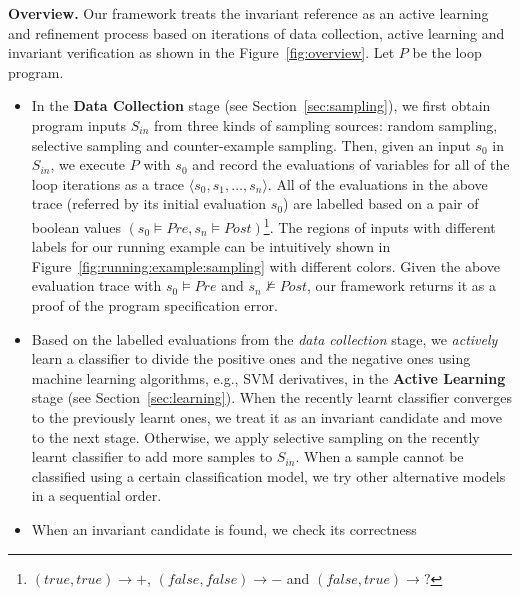 \medskip\noindent
\textbf{Overview.}
Our framework treats the invariant reference as an active learning and refinement process 
based on iterations of data collection, active learning and invariant verification 
as shown in the Figure~\ref{fig:overview}. 
Let $P$ be the loop program. 
\begin{itemize}
    \item 
    In the \textbf{Data Collection} stage (see Section~\ref{sec:sampling}), 
    we first obtain program inputs $S_{\mathit{in}}$ from three kinds of sampling sources: 
    random sampling, selective sampling and counter-example sampling. 
    Then, given an input $s_0$ in $S_{\mathit{in}}$, we execute $P$ with $s_0$ 
    and record the evaluations of variables for all of the loop iterations
    as a trace $\langle s_0, s_1, \ldots, s_n \rangle$.  
    All of the evaluations in the above trace (referred by its initial evaluation $s_0$) 
    are labelled based on a pair of boolean values 
    $(s_0 \models \mathit{Pre}, s_n \models \mathit{Post})$\footnote{
        $(\mathit{true}, \mathit{true}) \rightarrow +$, 
        $(\mathit{false}, \mathit{false}) \rightarrow -$ 
        and $(\mathit{false}, \mathit{true}) \rightarrow ?$}. 
    The regions of inputs with different labels for our running example can be intuitively shown 
    in Figure~\ref{fig:running:example:sampling} with different colors. 
    Given the above evaluation trace with
    $s_0 \models \mathit{Pre}$ and $s_n \not\models \mathit{Post}$, 
    our framework returns it as a proof of the program specification error. 
    \item 
    Based on the labelled evaluations from the \emph{data collection} stage, 
    we \emph{actively} learn a classifier to divide the positive ones and the negative ones 
    using machine learning algorithms, e.g., SVM derivatives, 
    in the \textbf{Active Learning} stage (see Section~\ref{sec:learning}). 
    When the recently learnt classifier converges to the previously learnt ones, 
    we treat it as an invariant candidate and move to the next stage. 
    Otherwise, we apply selective sampling on the recently learnt classifier 
    to add more samples to $S_{\mathit{in}}$. 
    When a sample cannot be classified using a certain classification model, 
    we try other alternative models in a sequential order. 
    \item 
    When an invariant candidate is found, we check its correctness 

\end{itemize}
